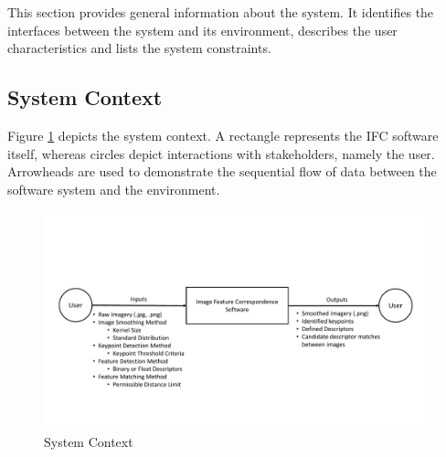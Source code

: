 \documentclass[12pt]{article}
\begin{document}
This section provides general information about the system.  It identifies the
interfaces between the system and its environment, describes the user
characteristics and lists the system constraints.

\subsection{System Context}
Figure \ref{Fig_SystemContext} depicts the system context. A rectangle represents 
the IFC software itself, whereas circles depict interactions with stakeholders, 
namely the user. Arrowheads are used to demonstrate the sequential flow of data 
between the software system and the environment.

\begin{figure}[h!]
\begin{center}
 \includegraphics[width=1.0\textwidth]{SystemContextFigure}
\caption{System Context}
\label{Fig_SystemContext} 
\end{center}
\end{figure}
\end{document}
